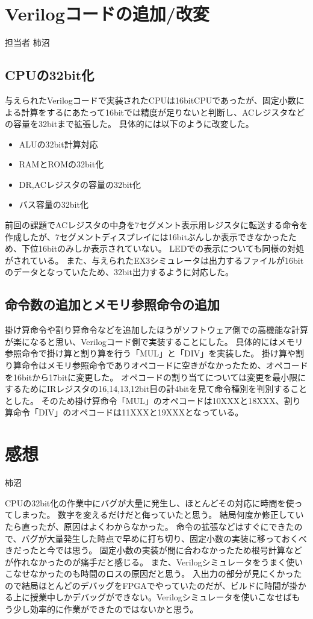 \documentclass{jsarticle}
\begin{document}
\section*{Verilogコードの追加/改変}
担当者 柿沼

\subsection*{CPUの32bit化}
与えられたVerilogコードで実装されたCPUは16bitCPUであったが、固定小数による計算をするにあたって16bitでは精度が足りないと判断し、ACレジスタなどの容量を32bitまで拡張した。
具体的には以下のように改変した。
\begin {itemize}
    \item ALUの32bit計算対応
    \item RAMとROMの32bit化
    \item DR,ACレジスタの容量の32bit化
    \item バス容量の32bit化
\end {itemize}
前回の課題でACレジスタの中身を7セグメント表示用レジスタに転送する命令を作成したが、7セグメントディスプレイには16bitぶんしか表示できなかったため、下位16bitのみしか表示されていない。
LEDでの表示についても同様の対処がされている。
また、与えられたEX3シミュレータは出力するファイルが16bitのデータとなっていたため、32bit出力するように対応した。

\subsection*{命令数の追加とメモリ参照命令の追加}
掛け算命令や割り算命令などを追加したほうがソフトウェア側での高機能な計算が楽になると思い、Verilogコード側で実装することにした。
具体的にはメモリ参照命令で掛け算と割り算を行う「MUL」と「DIV」を実装した。
掛け算や割り算命令はメモリ参照命令でありオペコードに空きがなかったため、オペコードを16bitから17bitに変更した。
オペコードの割り当てについては変更を最小限にするためにIRレジスタの16,14,13,12bit目の計4bitを見て命令種別を判別することとした。
そのため掛け算命令「MUL」のオペコードは10XXXと18XXX、割り算命令「DIV」のオペコードは11XXXと19XXXとなっている。

\section*{感想}
柿沼

CPUの32bit化の作業中にバグが大量に発生し、ほとんどその対応に時間を使ってしまった。
数字を変えるだけだと侮っていたと思う。
結局何度か修正していたら直ったが、原因はよくわからなかった。
命令の拡張などはすぐにできたので、バグが大量発生した時点で早めに打ち切り、固定小数の実装に移っておくべきだったと今では思う。
固定小数の実装が間に合わなかったため根号計算などが作れなかったのが痛手だと感じる。
また、Verilogシミュレータをうまく使いこなせなかったのも時間のロスの原因だと思う。
入出力の部分が見にくかったので結局ほとんどのデバッグをFPGAでやっていたのだが、ビルドに時間が掛かる上に授業中しかデバッグができない。Verilogシミュレータを使いこなせばもう少し効率的に作業ができたのではないかと思う。
\end{document}
